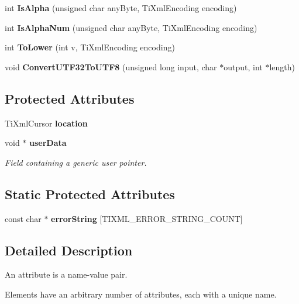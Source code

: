 \begin{CompactItemize}
\item 
int {\bf Is\-Alpha} (unsigned char any\-Byte, Ti\-Xml\-Encoding encoding)\label{classTiXmlBase_TiXmlUnknownf11}

\item 
int {\bf Is\-Alpha\-Num} (unsigned char any\-Byte, Ti\-Xml\-Encoding encoding)\label{classTiXmlBase_TiXmlUnknownf12}

\item 
int {\bf To\-Lower} (int v, Ti\-Xml\-Encoding encoding)\label{classTiXmlBase_TiXmlUnknownf13}

\item 
void {\bf Convert\-UTF32To\-UTF8} (unsigned long input, char $\ast$output, int $\ast$length)\label{classTiXmlBase_TiXmlUnknownf14}

\end{CompactItemize}
\subsection*{Protected Attributes}
\begin{CompactItemize}
\item 
Ti\-Xml\-Cursor {\bf location}\label{classTiXmlBase_TiXmlUnknownp7}

\item 
void $\ast$ {\bf user\-Data}\label{classTiXmlBase_TiXmlUnknownp8}

\begin{CompactList}\small\item\em Field containing a generic user pointer. \item\end{CompactList}\end{CompactItemize}
\subsection*{Static Protected Attributes}
\begin{CompactItemize}
\item 
const char $\ast$ {\bf error\-String} [TIXML\_\-ERROR\_\-STRING\_\-COUNT]
\end{CompactItemize}


\subsection{Detailed Description}
An attribute is a name-value pair. 

Elements have an arbitrary number of attributes, each with a unique name.


